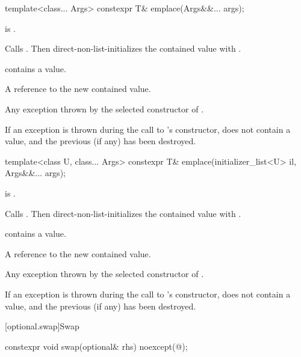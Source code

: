 %
\begin{itemdecl}
template<class... Args> constexpr T& emplace(Args&&... args);
\end{itemdecl}

\begin{itemdescr}
\pnum
\mandates
{} is .

\pnum
\effects
Calls . Then direct-non-list-initializes the contained value
with .

\pnum
\ensures
{} contains a value.

\pnum
\returns
A reference to the new contained value.

\pnum
\throws
Any exception thrown by the selected constructor of .

\pnum
\remarks
If an exception is thrown during the call to 's constructor,  does not contain a value, and the previous  (if any) has been destroyed.
\end{itemdescr}

%
\begin{itemdecl}
template<class U, class... Args> constexpr T& emplace(initializer_list<U> il, Args&&... args);
\end{itemdecl}

\begin{itemdescr}
\pnum
\constraints
{} is .

\pnum
\effects
Calls . Then direct-non-list-initializes the contained value with
.

\pnum
\ensures
{} contains a value.

\pnum
\returns
A reference to the new contained value.

\pnum
\throws
Any exception thrown by the selected constructor of .

\pnum
\remarks
If an exception is thrown during the call to 's constructor,  does not contain a value, and the previous  (if any) has been destroyed.
\end{itemdescr}

[optional.swap]{Swap}

%
\begin{itemdecl}
constexpr void swap(optional& rhs) noexcept(@\seebelow@);
\end{itemdecl}

